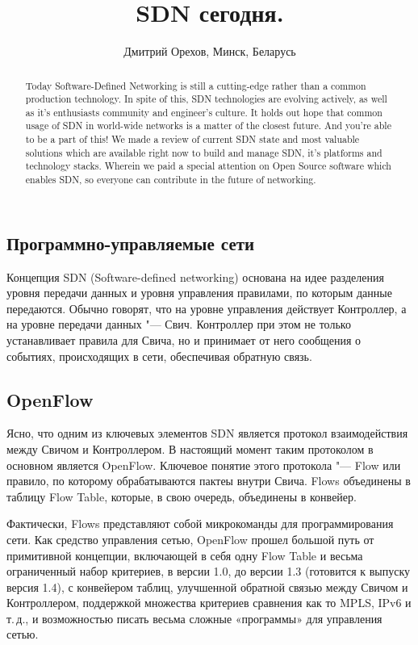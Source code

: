 \documentclass[10pt, a5paper]{article}
\begin{document}
\title{SDN сегодня.}
\author{Дмитрий Орехов, Минск, Беларусь}
\maketitle
\begin{abstract}
Today Software-Defined Networking is still a cutting-edge rather than a common production technology. In spite of this, SDN technologies are evolving actively, as well as it's enthusiasts com\-mu\-ni\-ty and engineer's culture. It holds out hope that common usage of SDN in world-wide networks is a matter of the closest future. And you're able to be a part of this!
We made a review of current SDN state and most valuable solutions which are available right now to build and manage SDN, it's platforms and technology stacks. Wherein we paid a special attention on Open Source software which enables SDN, so everyone can contribute in the future of networking.
\end{abstract}
\subsection*{Программно-управляемые сети}

Концепция SDN (Software-defined networking) основана на идее разделения уровня передачи данных и уровня управления правилами, по которым данные передаются. Обычно говорят, что на уровне управления действует Контроллер, а на уровне передачи данных "--- Свич. Контроллер при этом не только устанавливает правила для Свича, но и принимает от него сообщения о событиях, происходящих в сети, обеспечивая обратную связь.

\subsection*{OpenFlow}

Ясно, что одним из ключевых элементов SDN является протокол взаимодействия между Свичом и Контроллером. В настоящий момент таким протоколом в основном является OpenFlow. Ключевое понятие этого протокола "--- Flow или правило, по которому обрабатываются пактеы внутри Свича. Flows объединены в таблицу Flow Table, которые, в свою очередь, объединены в конвейер.

Фактически, Flows представляют собой микрокоманды для программирования сети. Как средство управления сетью, OpenFlow прошел большой путь от примитивной концепции, включающей в себя одну Flow Table и весьма ограниченный набор критериев, в версии 1.0, до версии 1.3 (готовится к выпуску версия 1.4), с конвейером таблиц, улучшенной обратной связью между Свичом и Контроллером, поддержкой множества критериев сравнения как то MPLS, IPv6 и т.\,д., и возможностью писать весьма сложные «программы» для управления сетью.
\end{document}
